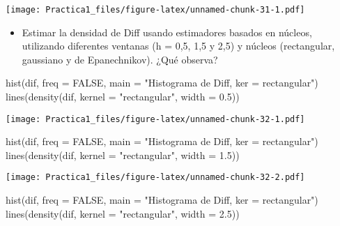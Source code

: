 \documentclass[
]{article}
\newenvironment{Shaded}{\begin{snugshade}}{\end{snugshade}}
\newcommand{\AttributeTok}[1]{\textcolor[rgb]{0.77,0.63,0.00}{#1}}
\newcommand{\ConstantTok}[1]{\textcolor[rgb]{0.00,0.00,0.00}{#1}}
\newcommand{\FloatTok}[1]{\textcolor[rgb]{0.00,0.00,0.81}{#1}}
\newcommand{\FunctionTok}[1]{\textcolor[rgb]{0.00,0.00,0.00}{#1}}
\newcommand{\NormalTok}[1]{#1}
\newcommand{\StringTok}[1]{\textcolor[rgb]{0.31,0.60,0.02}{#1}}
\providecommand{\tightlist}{%
  \setlength{\itemsep}{0pt}\setlength{\parskip}{0pt}}
\begin{document}
\texttt{[image: Practica1\_files/figure-latex/unnamed-chunk-31-1.pdf]}

\begin{itemize}
\tightlist
\item
  Estimar la densidad de Diff usando estimadores basados en núcleos,
  utilizando diferentes ventanas (h = 0,5, 1,5 y 2,5) y núcleos
  (rectangular, gaussiano y de Epanechnikov). ¿Qué observa?
\end{itemize}

\begin{Shaded}
\begin{Highlighting}[]
\FunctionTok{hist}\NormalTok{(dif, }\AttributeTok{freq =} \ConstantTok{FALSE}\NormalTok{, }\AttributeTok{main =} \StringTok{"Histograma de Diff, ker = rectangular"}\NormalTok{)}
\FunctionTok{lines}\NormalTok{(}\FunctionTok{density}\NormalTok{(dif, }\AttributeTok{kernel =} \StringTok{"rectangular"}\NormalTok{, }\AttributeTok{width =} \FloatTok{0.5}\NormalTok{))}
\end{Highlighting}
\end{Shaded}

\texttt{[image: Practica1\_files/figure-latex/unnamed-chunk-32-1.pdf]}

\begin{Shaded}
\begin{Highlighting}[]
\FunctionTok{hist}\NormalTok{(dif, }\AttributeTok{freq =} \ConstantTok{FALSE}\NormalTok{, }\AttributeTok{main =} \StringTok{"Histograma de Diff, ker = rectangular"}\NormalTok{)}
\FunctionTok{lines}\NormalTok{(}\FunctionTok{density}\NormalTok{(dif, }\AttributeTok{kernel =} \StringTok{"rectangular"}\NormalTok{, }\AttributeTok{width =} \FloatTok{1.5}\NormalTok{))}
\end{Highlighting}
\end{Shaded}

\texttt{[image: Practica1\_files/figure-latex/unnamed-chunk-32-2.pdf]}

\begin{Shaded}
\begin{Highlighting}[]
\FunctionTok{hist}\NormalTok{(dif, }\AttributeTok{freq =} \ConstantTok{FALSE}\NormalTok{, }\AttributeTok{main =} \StringTok{"Histograma de Diff, ker = rectangular"}\NormalTok{)}
\FunctionTok{lines}\NormalTok{(}\FunctionTok{density}\NormalTok{(dif, }\AttributeTok{kernel =} \StringTok{"rectangular"}\NormalTok{, }\AttributeTok{width =} \FloatTok{2.5}\NormalTok{))}
\end{Highlighting}
\end{Shaded}
\end{document}
